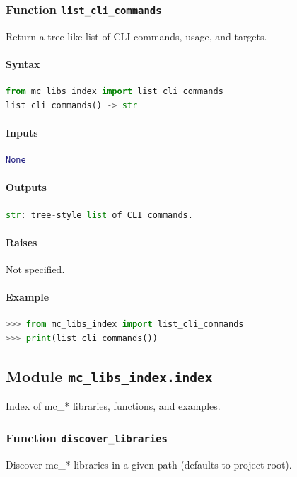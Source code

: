 \documentclass[11pt]{article}
\begin{document}
\subsubsection{Function \texttt{list\_cli\_commands}}
Return a tree-like list of CLI commands, usage, and targets.

\paragraph{Syntax}
\begin{lstlisting}[language=Python]
from mc_libs_index import list_cli_commands
list_cli_commands() -> str
\end{lstlisting}
\paragraph{Inputs}
\begin{lstlisting}[language=Python]
None
\end{lstlisting}
\paragraph{Outputs}
\begin{lstlisting}[language=Python]
str: tree-style list of CLI commands.
\end{lstlisting}
\paragraph{Raises}
Not specified.
\paragraph{Example}
\begin{lstlisting}[language=Python]
>>> from mc_libs_index import list_cli_commands
>>> print(list_cli_commands())
\end{lstlisting}

\subsection{Module \texttt{mc\_libs\_index.index}}
Index of mc\_* libraries, functions, and examples.

\subsubsection{Function \texttt{discover\_libraries}}
Discover mc\_* libraries in a given path (defaults to project root).
\end{document}
